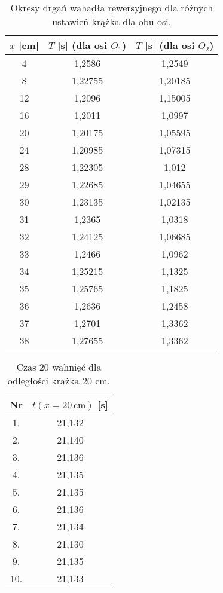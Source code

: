 \documentclass[a4paper,12pt]{article}
\begin{document}
\begin{table}[H]
  \centering
  \begin{tabular}{|c|c|c|}
    \hline
    $x$ [cm] & $T$ [s] (dla osi $O_1$) & $T$ [s] (dla osi $O_2$) \\
    \hline
    4  & 1,2586  & 1,2549  \\
    \hline
    8  & 1,22755 & 1,20185 \\
    \hline
    12 & 1,2096  & 1,15005 \\
    \hline
    16 & 1,2011  & 1,0997  \\
    \hline
    20 & 1,20175 & 1,05595 \\
    \hline
    24 & 1,20985 & 1,07315 \\
    \hline
    28 & 1,22305 & 1,012   \\
    \hline
    29 & 1,22685 & 1,04655 \\
    \hline
    30 & 1,23135 & 1,02135 \\
    \hline
    31 & 1,2365  & 1,0318  \\
    \hline
    32 & 1,24125 & 1,06685 \\
    \hline
    33 & 1,2466  & 1,0962  \\
    \hline
    34 & 1,25215 & 1,1325  \\
    \hline
    35 & 1,25765 & 1,1825  \\
    \hline
    36 & 1,2636  & 1,2458  \\
    \hline
    37 & 1,2701  & 1,3362  \\
    \hline
    38 & 1,27655 & 1,3362  \\
    \hline
  \end{tabular}
  \caption{Okresy drgań wahadła rewersyjnego dla różnych ustawień krążka dla obu osi.}
  \label{tab:okresy}
\end{table}

\begin{table}[H]
  \centering
  \begin{tabular}{|c|c|}
    \hline
    Nr & $t(x=20\,\text{cm})$ [s] \\
    \hline
    1.  & 21,132 \\
    \hline
    2.  & 21,140  \\
    \hline
    3. & 21,136 \\
    \hline
    4. & 21,135 \\
    \hline
    5. & 21,135 \\
    \hline
    6. & 21,136 \\
    \hline
    7. & 21,134 \\
    \hline
    8. & 21,130 \\
    \hline
    9. & 21,135 \\
    \hline
    10. & 21,133 \\
    \bottomrule
  \end{tabular}
  \caption{Czas 20 wahnięć dla odległości krążka 20 cm.}
  \label{tab:last_column}
\end{table}
\end{document}
